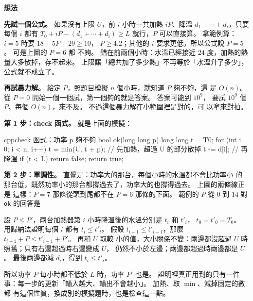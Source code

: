 \textbf{想法}

\textbf{先試一個公式。} 如果沒有上限 $U$，前 $i$ 小時一共加熱 $iP$、降溫
$d_1 + \cdots + d_i$，只要每個 $i$ 都有 $T_0 + iP - (d_1 + \cdots + d_i) \ge L$
就行，$P$ 可以直接算。 拿範例算：$i = 5$ 時要 $18 + 5P - 29 \ge 10$，
$P \ge 4.2$；其他的 $i$ 要求更低，所以公式說 $P = 5$。 可是上圖的 $P = 6$ 都
不夠。 錯在前兩個小時：水溫已經接近 $24$ 度，加熱的熱量大多散掉，存不起來。
上限讓「總共加了多少熱」不再等於「水溫升了多少」，公式就不成立了。

\textbf{再試暴力解。} 給定 $P$，照題目模擬 $n$ 個小時，就知道 $P$ 夠不夠，這
是 $O(n)$。 從 $P = 0$ 開始一個一個試，第一個夠的就是答案。 答案可能到 $10^9$，
要試 $10^9$ 個 $P$、每個 $O(n)$，來不及。 不過這個暴力解在小範圍裡是對的，可
以拿來對拍。

\textbf{第 1 步：check 函式。} 就是上面的模擬：

\begin{code}{cpp}{check 函式：功率 p 夠不夠}
bool ok(long long p) {
    long long t = T0;
    for (int i = 0; i < n; i++) {
        t = min(U, t + p);      // 先加熱，超過 U 的部分散掉
        t -= d[i];              // 再降溫
        if (t < L) {
            return false;
        }
    }
    return true;
}
\end{code}

\textbf{第 2 步：單調性。} 直覺是：功率大的那台，每個小時的水溫都不會比功率小
的那台低，既然功率小的那台都撐過去了，功率大的也撐得過去。 上圖的兩條線正是
這樣：$P = 7$ 那條從頭到尾都不在 $P = 6$ 那條的下面。 範例的 $P$ 從 $0$ 到
$14$ 對 \texttt{ok} 的回答是

\begin{center}
\label{fig:heater-ft}
\end{center}

\begin{whybox}
設 $P \le P'$，兩台加熱器第 $i$ 小時降溫後的水溫分別是 $t_i$ 和 $t'_i$，
$t_0 = t'_0 = T_0$。 用歸納法證明每個 $i$ 都有 $t_i \le t'_i$。 假設
$t_{i-1} \le t'_{i-1}$，那麼 $t_{i-1} + P \le t'_{i-1} + P'$。 再和 $U$ 取較
小的值，大小關係不變：兩邊都沒超過 $U$ 時照舊；只有右邊超過時右邊變成 $U$，
仍然不小於左邊；兩邊都超過時兩邊都是 $U$。 最後兩邊都減 $d_i$，得到
$t_i \le t'_i$。

所以功率 $P$ 每小時都不低於 $L$ 時，功率 $P'$ 也是。 證明裡真正用到的只有一件
事：每一步的更新「輸入越大、輸出不會越小」。 加熱、取 $\min$、減掉固定的數都
有這個性質，換成別的模擬題時，也是檢查這一點。
\end{whybox}

